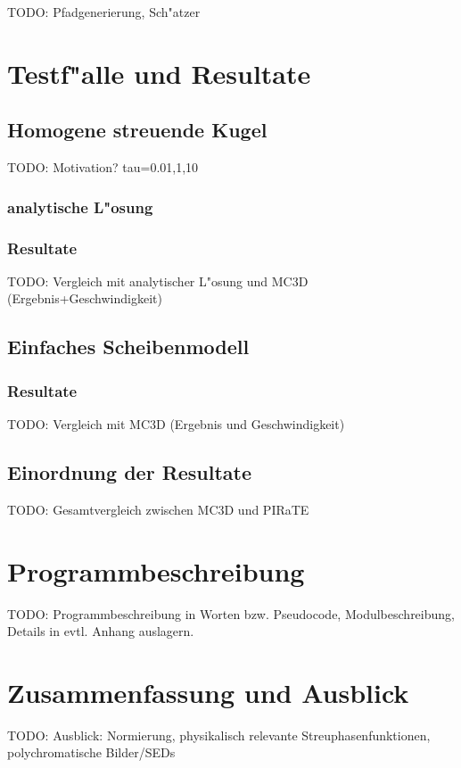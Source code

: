 \documentclass[11pt,a4paper,DIVcalc,BCOR8mm,titlepage,twoside]{scrartcl}
\begin{document}
	TODO: Pfadgenerierung, Sch"atzer
	
	\section{Testf"alle und Resultate}
	\subsection{Homogene streuende Kugel}
	TODO: Motivation? tau=0.01,1,10
	\subsubsection{analytische L"osung}
	\subsubsection{Resultate}
	TODO: Vergleich mit analytischer L"osung und MC3D (Ergebnis+Geschwindigkeit)
	\subsection{Einfaches Scheibenmodell}
	\subsubsection{Resultate}
	TODO: Vergleich mit MC3D (Ergebnis und Geschwindigkeit)
	\subsection{Einordnung der Resultate}
	TODO: Gesamtvergleich zwischen MC3D und PIRaTE
	
	\section{Programmbeschreibung}
	TODO: Programmbeschreibung in Worten bzw. Pseudocode, Modulbeschreibung, Details in evtl. Anhang auslagern.
	
	\section{Zusammenfassung und Ausblick}
	TODO: Ausblick: Normierung, physikalisch relevante Streuphasenfunktionen, polychromatische Bilder/SEDs

	
	
\end{document}
